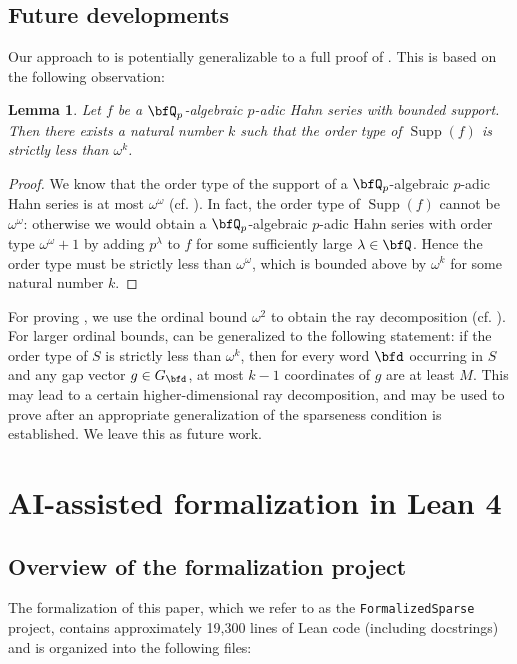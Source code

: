 \documentclass[english,oneside]{smfart}
\newcommand{\opn}[1]{\operatorname{#1}}
\newtheorem{lemma}[theorem]{Lemma}
\begin{document}
\subsection{Future developments}
Our approach to  is potentially generalizable to a full proof of . This is based on the following observation:
\begin{lemma}
    Let $f$ be a $\bfQ_p$-algebraic $p$-adic Hahn series with bounded support. Then there exists a natural number $k$ such that the order type of $\opn{Supp}(f)$ is strictly less than $\omega^k$.
\end{lemma}
\begin{proof}
    We know that the order type of the support of a $\bfQ_p$-algebraic $p$-adic Hahn series is at most $\omega^\omega$ (cf. \cite[Section 4]{kedlayaPowerSeriesPAdic2001}). In fact, the order type of $\opn{Supp}(f)$ cannot be $\omega^\omega$: otherwise we would obtain a $\bfQ_p$-algebraic $p$-adic Hahn series with order type $\omega^\omega+1$ by adding $p^\lambda$ to $f$ for some sufficiently large $\lambda\in\bfQ$. Hence the order type must be strictly less than $\omega^\omega$, which is bounded above by $\omega^k$ for some natural number $k$.
\end{proof}

For proving , we use the ordinal bound $\omega^2$ to obtain the ray decomposition (cf. ). For larger ordinal bounds,  can be generalized to the following statement: if the order type of $S$ is strictly less than $\omega^k$, then for every word $\bfd$ occurring in $S$ and any gap vector $g\in G_{\bfd}$, at most $k-1$ coordinates of $g$ are at least $M$. This may lead to a certain higher-dimensional ray decomposition, and may be used to prove  after an appropriate generalization of the sparseness condition is established. We leave this as future work.

\iffalse
\appendix
\section{AI-assisted formalization in Lean 4}\label{sec:formal}
\subsection{Overview of the formalization project}
The formalization of this paper, which we refer to as the \texttt{FormalizedSparse} project, contains approximately 19,300 lines of Lean code (including docstrings) and is organized into the following files:
\end{document}
